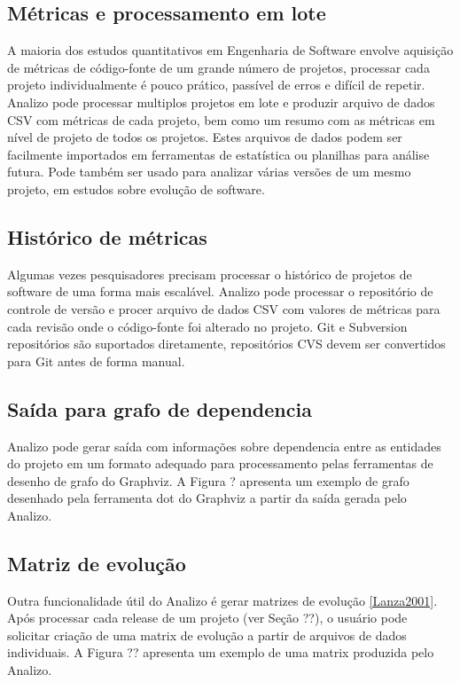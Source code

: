 \documentclass{article}
\begin{document}
\subsection{Métricas e processamento em lote}

A maioria dos estudos quantitativos em Engenharia de Software envolve aquisição de
métricas de código-fonte de um grande número de projetos, processar cada projeto
individualmente é pouco prático, passível de erros e difícil de repetir. Analizo pode processar
multiplos projetos em lote e produzir arquivo de dados CSV com métricas de cada projeto,
bem como um resumo com as métricas em nível de projeto de todos os projetos. Estes
arquivos de dados podem ser facilmente importados em ferramentas de estatística ou planilhas para
análise futura. Pode também ser usado para analizar várias versões de um mesmo projeto,
em estudos sobre evolução de software.

\subsection{Histórico de métricas}

Algumas vezes pesquisadores precisam processar o histórico de projetos de software de
uma forma mais escalável. Analizo pode processar o repositório  de controle de versão e
procer arquivo de dados CSV com valores de métricas para cada revisão onde o código-fonte
foi alterado no projeto. Git e Subversion repositórios são suportados diretamente, repositórios
CVS  devem ser convertidos para Git antes de forma manual.

\subsection{Saída para grafo de dependencia}

Analizo pode gerar saída com informações sobre dependencia entre as entidades do projeto
em um formato adequado para processamento pelas ferramentas de desenho de grafo do Graphviz.
A Figura ? apresenta um exemplo de grafo desenhado pela ferramenta dot do Graphviz a partir
da saída gerada pelo Analizo.

\subsection{Matriz de evolução}

Outra funcionalidade útil do Analizo é gerar matrizes de evolução \ref{Lanza2001}. Após
processar cada release de um projeto (ver Seção ??), o usuário pode solicitar criação
de uma matrix de evolução a partir de arquivos de dados individuais. A Figura ?? apresenta um
exemplo de uma matrix produzida pelo Analizo.
\end{document}
